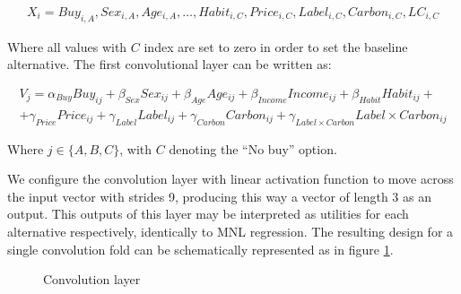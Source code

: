 \documentclass[12pt,]{article}
\begin{document}
\begin{multline}
X_i = Buy_{i,A}, Sex_{i,A}, Age_{i,A}, \dots, Habit_{i,C}, Price_{i,C}, Label_{i,C}, Carbon_{i,C}, LC_{i,C}
\end{multline}

Where all values with \(C\) index are set to zero in order to set the
baseline alternative. The first convolutional layer can be written as:

\begin{multline}
V_j = \alpha_{Buy} Buy_{ij} + \beta_{Sex} Sex_{ij} + \beta_{Age} Age_{ij} + \beta_{Income} Income_{ij} + \beta_{Habit} Habit_{ij} + \\
+ \gamma_{Price} Price_{ij} + \gamma_{Label} Label_{ij} + \gamma_{Carbon} Carbon_{ij} + \gamma_{Label \times Carbon} Label \times Carbon_{ij}
\end{multline}

Where \(j \in \{A, B, C\}\), with \(C\) denoting the ``No buy'' option.

We configure the convolution layer with linear activation function to
move across the input vector with strides 9, producing this way a vector
of length 3 as an output. This outputs of this layer may be interpreted
as utilities for each alternative respectively, identically to MNL
regression. The resulting design for a single convolution fold can be
schematically represented as in figure \ref{fig:convl}.

\begin{figure}[!htbp] \centering 
 \caption{Convolution layer} 
 \label{fig:convl} 
\end{figure}
\end{document}

